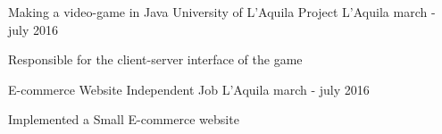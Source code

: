 


\begin{cventries}


\cventry
{Making a video-game in Java} %
{University of L'Aquila Project} %
{L'Aquila} %
{march - july 2016} %
{ %
	\begin{cvitems}
		\item {Responsible for the client-server interface of the game}
	\end{cvitems}
}



\cventry
{E-commerce Website} %
{Independent Job } %
{L'Aquila} %
{march - july 2016} %
{ %
\begin{cvitems}
\item {Implemented a Small E-commerce website}
\end{cvitems}
}




\end{cventries}